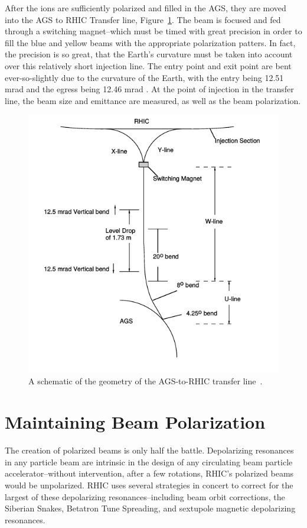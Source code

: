 After the ions are sufficiently polarized and filled in the AGS, they are moved
into the AGS to RHIC Transfer line, Figure~\ref{fig:ags_to_rhic}. The beam is
focused and fed through a switching magnet--which must be timed with great
precision in order to fill the blue and yellow beams with the appropriate
polarization patters. In fact, the precision is so great, that the Earth's
curvature must be taken into account over this relatively short injection line.
The entry point and exit point are bent ever-so-slightly due to the curvature of
the Earth, with the entry being 12.51 mrad and the egress being 12.46 mrad
\cite{RHIC2006}.  At the point of injection in the transfer line, the beam size
and emittance are measured, as well as the beam polarization. 

\begin{figure}
  \centering
  \includegraphics[width=0.6\linewidth]{./figures/ags_to_rhic_transfer}
  \caption{
    A schematic of the geometry of the AGS-to-RHIC transfer line~\cite{RHIC2006}.
  }
  \label{fig:ags_to_rhic}
\end{figure}

\clearpage
\section{Maintaining Beam Polarization}
\label{sec:beam_polarization}

The creation of polarized beams is only half the battle. Depolarizing resonances
in any particle beam are intrinsic in the design of any circulating beam
particle accelerator--without intervention, after a few rotations, RHIC's
polarized beams would be unpolarized. RHIC uses several strategies in concert to
correct for the largest of these depolarizing resonances--including beam orbit
corrections, the Siberian Snakes, Betatron Tune Spreading, and sextupole
magnetic depolarizing resonances. 

